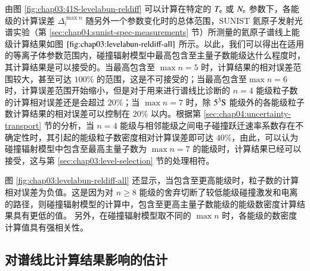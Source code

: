 由图 \ref{fig:chap03:41S-levelabun-reldiff} 可以计算在特定的 $T_{\rm e}$ 或 $N_{\rm e}$ 参数下，各能级的计算误差 $\Delta_i^{\max n}$ 随另外一个参数变化时的总体范围，SUNIST 氦原子发射光谱实验（第 \ref{sec:chap04:sunist-spec-measurements} 节）所测量的氦原子谱线上能级计算结果如图 $\ref{fig:chap03:levelabun-reldiff-all}$ 所示。以此，我们可以得出在适用的等离子体参数范围内，碰撞辐射模型中最高包含至主量子数能级达什么程度时，其计算结果是可以接受的。当最高包含至 $\max n=5$ 时，计算结果的相对误差范围较大，甚至可达 $100\%$ 的范围，这是不可接受的；当最高包含至$\max n=6$ 时，计算误差范围开始缩小，但是对于用来进行谱线比诊断的 $n=4$ 能级粒子数的计算相对误差还是会超过 $20\%$；当 $\max n=7$ 时，除 $5^3{\rm S}$ 能级外的各能级粒子数计算结果的相对误差可以控制在 $20\%$ 以内。根据第 \ref{sec:chap04:uncertainty-transport} 节的分析，当 $n=4$ 能级与相邻能级之间电子碰撞跃迁速率系数存在不确定性时，其引起的能级粒子数密度相对计算误差即可达 $40\%$，由此，可以认为碰撞辐射模型中包含至最高主量子数为 $\max n=7$ 的能级时，计算结果已经可以接受，这与第 \ref{sec:chap03:level-selection} 节的处理相符。

图 \ref{fig:chap03:levelabun-reldiff-all} 还显示，当包含至更高能级时，粒子数的计算相对误差为负值。这是因为对 $n\ge 8$ 能级的舍弃切断了较低能级碰撞激发和电离的路径\cite{Fujimoto1979-HeCR}，则碰撞辐射模型的计算中，包含至更高主量子数能级的能级数密度计算结果具有更低的值。%
另外，在碰撞辐射模型取不同的 $\max n$ 时，各能级的数密度计算值具有强相关性。

\subsection{对谱线比计算结果影响的估计}

